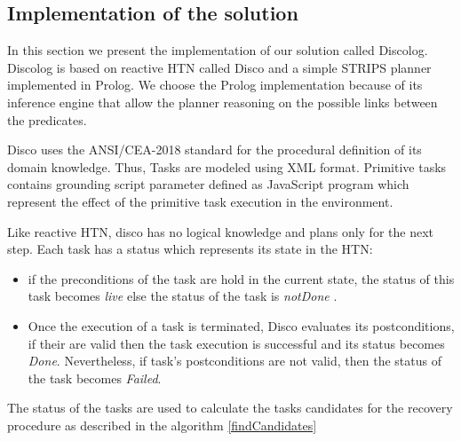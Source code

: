 \documentclass[conference]{IEEEtran}
\begin{document}
	
		\subsection{Implementation of the solution}
		
	\par In this section we present the implementation of our solution called Discolog. Discolog is based on reactive HTN called Disco \cite{rich2009building} and a simple STRIPS planner implemented in Prolog. We choose the Prolog implementation because of its inference engine that allow the planner reasoning on the possible links between the predicates.
	\par  Disco uses the ANSI/CEA-2018 standard for the procedural definition of its domain knowledge. Thus, Tasks are modeled using XML
	format. Primitive tasks contains grounding script parameter defined	as JavaScript program which represent the effect of the primitive task execution
	in the environment.
	\par  Like reactive HTN, disco has no logical knowledge and plans only for the next step. Each task has a status which represents its state in the HTN:
	\begin{itemize}
	\item  if the preconditions of the task are hold in the current state, the status of this task becomes \textit{live} else the status of the task is \textit{notDone} .
	\item  Once the execution of a task is terminated, Disco evaluates its postconditions, if their are valid then the task execution is successful and its status becomes \textit{Done}. Nevertheless, if task's postconditions  are not valid, then the status of the task becomes \textit{Failed}.
	\end{itemize}
	  The status of the tasks are used to calculate the tasks candidates for the recovery procedure as described in the algorithm \ref{findCandidates} 		
	
\end{document}
